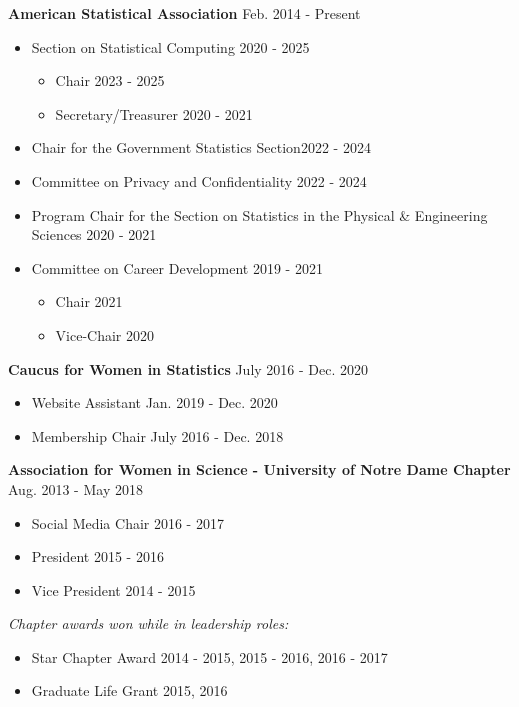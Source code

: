 \textbf{American Statistical Association} \hfill Feb. 2014 - Present
    \begin{itemize}
        \item Section on Statistical Computing \hfill 2020 - 2025
        \begin{itemize}
            \item Chair \hfill 2023 - 2025
            \item Secretary/Treasurer \hfill 2020 - 2021
        \end{itemize}
        \item Chair for the Government Statistics Section\hfill 2022 - 2024
        \item Committee on Privacy and Confidentiality \hfill 2022 - 2024
        \item Program Chair for the Section on Statistics in the Physical \& Engineering Sciences \hfill 2020 - 2021
        \item Committee on Career Development \hfill 2019 - 2021
        \begin{itemize}
            \item Chair \hfill 2021
            \item Vice-Chair \hfill 2020
        \end{itemize}
    \end{itemize}
    
\leadershipspace
\textbf{Caucus for Women in Statistics} \hfill July 2016 - Dec. 2020
\begin{itemize}
    \item Website Assistant \hfill Jan. 2019 - Dec. 2020
    \item Membership Chair \hfill July 2016 - Dec. 2018
\end{itemize}

\leadershipspace
\textbf{Association for Women in Science - University of Notre Dame Chapter} \hfill Aug. 2013 - May 2018
\begin{itemize}
    \item Social Media Chair \hfill 2016 - 2017
    \item President \hfill 2015 - 2016
    \item Vice President \hfill 2014 - 2015
\end{itemize}
\textit{Chapter awards won while in leadership roles:}
\begin{itemize}
    \item Star Chapter Award \hfill 2014 - 2015, 2015 - 2016, 2016 - 2017
    \item Graduate Life Grant \hfill 2015, 2016
\end{itemize}

